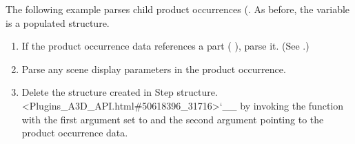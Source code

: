 \documentclass[letterpaper,12pt,english,openany,oneside]{sphinxmanual}
\begin{document}
The following example parses child product occurrences (. As before, the  variable is a populated  structure.

\begin{sphinxVerbatim}[commandchars=\\\{\}]
        
  \PYG{p}{[}\PYG{p}{]} 
\end{sphinxVerbatim}
\begin{enumerate}
%
\item {} 
If the product occurrence data references a part ( ), parse it. (See .)

\item {} 
Parse any scene display parameters in the product occurrence.

\item {} 
Delete the  structure created in Step  structure. <Plugins\_A3D\_API.html\#50618396\_31716>`\_\_ by invoking the  function with the first argument set to  and the second argument pointing to the product occurrence data.

\end{enumerate}

\begin{sphinxVerbatim}[commandchars=\\\{\}]
   
\end{sphinxVerbatim}
\end{document}
